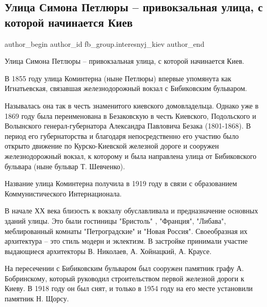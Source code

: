  
 
 
 
 
 
\subsection{Улица Симона Петлюры – привокзальная улица, с которой начинается Киев}
\label{sec:18_10_2021.fb.fb_group.interesnyj_kiev.1.ulica_simona_petljury}
 
\ifcmt
 author_begin
   author_id fb_group.interesnyj_kiev
 author_end
\fi

Улица Симона Петлюры – привокзальная улица, с которой начинается Киев.

В 1855 году улица Коминтерна (ныне Петлюры) впервые упомянута как Игнатьевская,
связавшая железнодорожный вокзал с Бибиковским бульваром.

Называлась она так в честь знаменитого киевского домовладельца. Однако уже в
1869 году была переименована в Безаковскую в честь Киевского, Подольского и
Волынского генерал-губернатора Александра Павловича Безака (1801-1868). В
период его губернаторства и благодаря непосредственно его участию было открыто
движение по Курско-Киевской железной дороге и сооружен железнодорожный вокзал,
к которому и была направлена улица от Бибиковского бульвара (ныне бульвар Т.
Шевченко).

Название улица Коминтерна получила в 1919 году в связи с образованием
Коммунистического Интернационала.

В начале ХХ века близость к вокзалу обуславливала и предназначение основных
зданий улицы. Это были гостиницы "Бристоль" , "Франция", "Либава",
меблированный комнаты "Петроградские" и "Новая Россия". Своеобразная их
архитектура – это стиль модерн и эклектизм. В застройке принимали участие
выдающиеся архитекторы В. Николаев, А. Хойнацкий, А. Краусе.

На пересечении с Бибиковским бульваром был сооружен памятник графу А.
Бобринскому, который руководил строительством первой железной дороги к Киеву. В
1918 году он был снят, и только в 1954 году на его месте установили памятник Н.
Щорсу.

